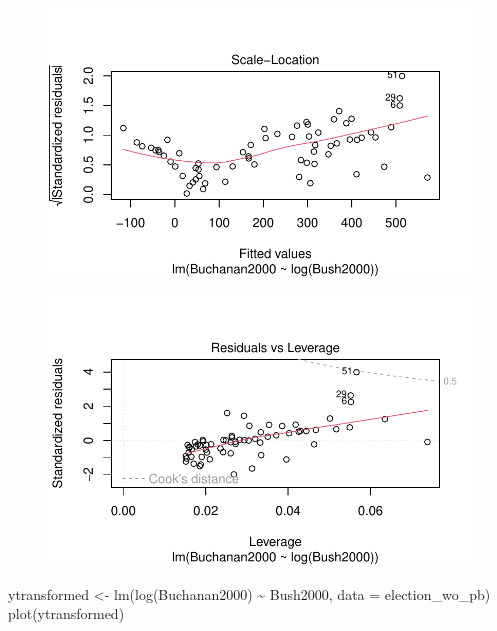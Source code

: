 \documentclass[
  letterpaper,
  DIV=11,
  numbers=noendperiod]{scrartcl}
\newenvironment{Shaded}{\begin{snugshade}}{\end{snugshade}}
\newcommand{\AttributeTok}[1]{\textcolor[rgb]{0.40,0.45,0.13}{#1}}
\newcommand{\FunctionTok}[1]{\textcolor[rgb]{0.28,0.35,0.67}{#1}}
\newcommand{\NormalTok}[1]{\textcolor[rgb]{0.00,0.23,0.31}{#1}}
\newcommand{\OtherTok}[1]{\textcolor[rgb]{0.00,0.23,0.31}{#1}}
\newcommand{\SpecialCharTok}[1]{\textcolor[rgb]{0.37,0.37,0.37}{#1}}
\begin{document}
\begin{figure}[H]

{\centering \includegraphics{case_study_1_files/figure-pdf/unnamed-chunk-3-3.pdf}

}

\end{figure}

\begin{figure}[H]

{\centering \includegraphics{case_study_1_files/figure-pdf/unnamed-chunk-3-4.pdf}

}

\end{figure}

\begin{Shaded}
\begin{Highlighting}[]
\NormalTok{ytransformed }\OtherTok{\textless{}{-}} \FunctionTok{lm}\NormalTok{(}\FunctionTok{log}\NormalTok{(Buchanan2000) }\SpecialCharTok{\textasciitilde{}}\NormalTok{ Bush2000, }\AttributeTok{data =}\NormalTok{ election\_wo\_pb)}
\FunctionTok{plot}\NormalTok{(ytransformed)}
\end{Highlighting}
\end{Shaded}
\end{document}
